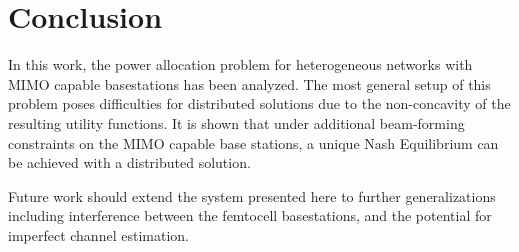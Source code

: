 \documentclass[12pt,a4paper]{report}
\begin{document}



\chapter{Conclusion}
In this work, the power allocation problem for heterogeneous networks with MIMO capable basestations has been analyzed. The most general setup of this problem poses difficulties for distributed solutions due to the non-concavity of the resulting utility functions. It is shown that under additional beam-forming constraints on the MIMO capable base stations, a unique Nash Equilibrium can be achieved with a distributed solution. 
\par
Future work should extend the system presented here to further generalizations including interference between the femtocell basestations, and the potential for imperfect channel estimation. 
\newpage

\end{document}

